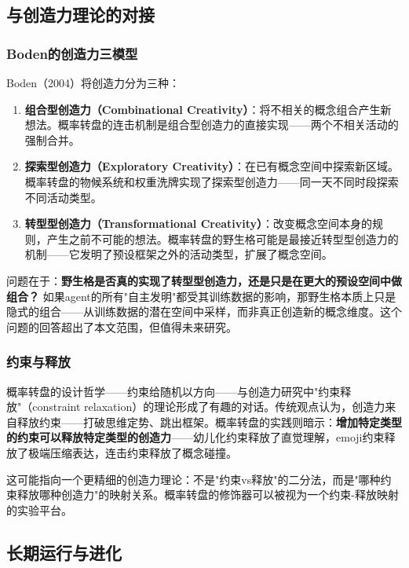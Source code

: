\documentclass[12pt,a4paper]{ctexart}
\begin{document}
\subsection{与创造力理论的对接}

\subsubsection{Boden的创造力三模型}

Boden（2004）\cite{boden2004}将创造力分为三种：

\begin{enumerate}[nosep]
\item \textbf{组合型创造力（Combinational Creativity）}：将不相关的概念组合产生新想法。概率转盘的连击机制是组合型创造力的直接实现——两个不相关活动的强制合并。

\item \textbf{探索型创造力（Exploratory Creativity）}：在已有概念空间中探索新区域。概率转盘的物候系统和权重洗牌实现了探索型创造力——同一天不同时段探索不同活动类型。

\item \textbf{转型型创造力（Transformational Creativity）}：改变概念空间本身的规则，产生之前不可能的想法。概率转盘的野生格可能是最接近转型型创造力的机制——它发明了预设框架之外的活动类型，扩展了概念空间。
\end{enumerate}

问题在于：\textbf{野生格是否真的实现了转型型创造力，还是只是在更大的预设空间中做组合？} 如果agent的所有"自主发明"都受其训练数据的影响，那野生格本质上只是隐式的组合——从训练数据的潜在空间中采样，而非真正创造新的概念维度。这个问题的回答超出了本文范围，但值得未来研究。

\subsubsection{约束与释放}

概率转盘的设计哲学——约束给随机以方向——与创造力研究中"约束释放"（constraint relaxation）的理论形成了有趣的对话。传统观点认为，创造力来自释放约束——打破思维定势、跳出框架。概率转盘的实践则暗示：\textbf{增加特定类型的约束可以释放特定类型的创造力}——幼儿化约束释放了直觉理解，emoji约束释放了极端压缩表达，连击约束释放了概念碰撞。

这可能指向一个更精细的创造力理论：不是"约束vs释放"的二分法，而是"哪种约束释放哪种创造力"的映射关系。概率转盘的修饰器可以被视为一个约束-释放映射的实验平台。

\subsection{长期运行与进化}
\end{document}
